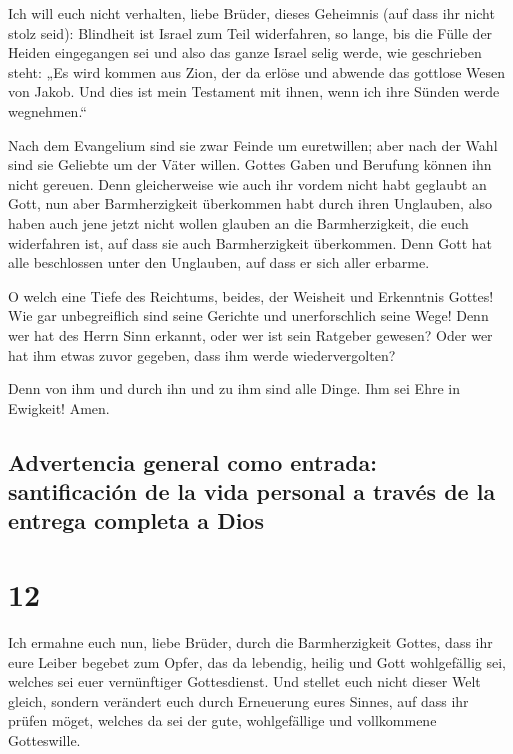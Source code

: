  Ich will euch nicht verhalten, liebe Brüder, dieses
Geheimnis (auf dass ihr nicht stolz seid): Blindheit ist Israel zum Teil
widerfahren, so lange, bis die Fülle der Heiden eingegangen sei
 und also das ganze Israel selig werde, wie geschrieben
steht: „Es wird kommen aus Zion, der da erlöse und abwende das gottlose
Wesen von Jakob.  Und dies ist mein Testament mit ihnen,
wenn ich ihre Sünden werde wegnehmen.``

 Nach dem Evangelium sind sie zwar Feinde um euretwillen;
aber nach der Wahl sind sie Geliebte um der Väter willen.
 Gottes Gaben und Berufung können ihn nicht gereuen.
 Denn gleicherweise wie auch ihr vordem nicht habt
geglaubt an Gott, nun aber Barmherzigkeit überkommen habt durch ihren
Unglauben,  also haben auch jene jetzt nicht wollen
glauben an die Barmherzigkeit, die euch widerfahren ist, auf dass sie
auch Barmherzigkeit überkommen.  Denn Gott hat alle
beschlossen unter den Unglauben, auf dass er sich aller erbarme.

 O welch eine Tiefe des Reichtums, beides, der Weisheit
und Erkenntnis Gottes! Wie gar unbegreiflich sind seine Gerichte und
unerforschlich seine Wege!  Denn wer hat des Herrn Sinn
erkannt, oder wer ist sein Ratgeber gewesen?  Oder wer
hat ihm etwas zuvor gegeben, dass ihm werde wiedervergolten?

 Denn von ihm und durch ihn und zu ihm sind alle Dinge.
Ihm sei Ehre in Ewigkeit! Amen.

\hypertarget{advertencia-general-como-entrada-santificaciuxf3n-de-la-vida-personal-a-travuxe9s-de-la-entrega-completa-a-dios}{%
\subsection{Advertencia general como entrada: santificación de la vida
personal a través de la entrega completa a
Dios}\label{advertencia-general-como-entrada-santificaciuxf3n-de-la-vida-personal-a-travuxe9s-de-la-entrega-completa-a-dios}}

\hypertarget{section-11}{%
\section{12}\label{section-11}}

 Ich ermahne euch nun, liebe Brüder, durch die
Barmherzigkeit Gottes, dass ihr eure Leiber begebet zum Opfer, das da
lebendig, heilig und Gott wohlgefällig sei, welches sei euer
vernünftiger Gottesdienst.  Und stellet euch nicht dieser
Welt gleich, sondern verändert euch durch Erneuerung eures Sinnes, auf
dass ihr prüfen möget, welches da sei der gute, wohlgefällige und
vollkommene Gotteswille.

